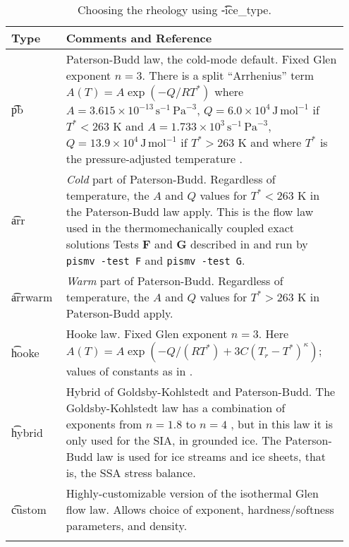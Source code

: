 \begin{table}[ht]
\centering
\caption{Choosing the rheology using \t{-ice_type}.}\label{tab:flowlaw}
\small
\begin{tabular}{p{0.15\linewidth}p{0.8\linewidth}}\toprule
\textbf{Type} & \textbf{Comments and Reference} \\ \midrule
\t{pb} &  Paterson-Budd law, the cold-mode default.  Fixed Glen exponent $n=3$.  There is a split ``Arrhenius'' term $A(T) = A \exp(-Q/RT^*)$ where \mbox{$A = 3.615 \times 10^{-13}\, \text{s}^{-1}\, \text{Pa}^{-3}$}, \mbox{$Q = 6.0 \times 10^4\, \text{J}\, \text{mol}^{-1}$} if $T^* < 263$ K and
 \mbox{$A = 1.733 \times 10^{3}\, \text{s}^{-1}\, \text{Pa}^{-3}$}, \mbox{$Q = 13.9 \times 10^4\, \text{J}\, \text{mol}^{-1}$} if $T^* > 263$ K and where $T^*$ is the pressure-adjusted temperature \cite{PatersonBudd}. \\
\t{arr} &  \emph{Cold} part of Paterson-Budd.  Regardless of temperature, the $A$ and $Q$ values for $T^*<263$ K in  the Paterson-Budd law apply.  This is the flow law used in the thermomechanically coupled exact solutions Tests \textbf{F} and \textbf{G} described in \cite{BBL,BB} and run by \texttt{pismv -test F} and \texttt{pismv -test G}. \\
\t{arrwarm} & \emph{Warm} part of Paterson-Budd.  Regardless of temperature, the $A$ and $Q$ values for $T^*>263$ K in Paterson-Budd apply.\\
\t{hooke} & Hooke law.  Fixed Glen exponent $n=3$.  Here  $A(T) = A \exp(-Q/(RT^*) + 3C (T_r - T^*)^\kappa)$; values of  constants as in \cite{Hooke,PayneBaldwin}.\\
\t{hybrid} &  Hybrid of Goldsby-Kohlstedt and Paterson-Budd.  The Goldsby-Kohlstedt law has a combination of exponents  from $n=1.8$ to $n=4$ \cite{GoldsbyKohlstedt}, but in this law it is only used for the SIA, in grounded ice.  The Paterson-Budd law is used for ice streams and ice sheets, that is, the SSA stress balance. \\
\t{custom} & Highly-customizable version of the isothermal Glen flow law.  Allows choice of exponent, hardness/softness parameters, and density. \\
\bottomrule
\normalsize	
\end{tabular}
\end{table}

